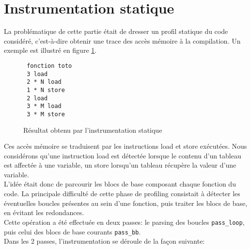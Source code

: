 \section{Instrumentation statique}

La problématique de cette partie était de dresser un profil statique du code considéré, c'est-à-dire obtenir une trace des accès mémoire à la compilation. Un exemple est illustré en figure \ref{fig:static_result}.

\begin{figure}[here]
  \centering
\begin{verbatim}
 fonction toto
 3 load
 2 * N load
 1 * N store
 2 load
 3 * M load
 3 * M store
\end{verbatim}
  \caption{Résultat obtenu par l'instrumentation statique}
  \label{fig:static_result}
\end{figure}

 Ces accès mémoire se traduisent par les instructions load et store exécutées. Nous considérons qu'une instruction load est détectée lorsque le contenu d'un tableau est affectée à une variable, un store lorsqu'un tableau récupère la valeur d'une variable.\\

L'idée était donc de parcourir les blocs de base composant chaque fonction du code. La principale difficulté de cette phase de profiling consistait à détecter les éventuelles boucles présentes au sein d'une fonction, puis traiter les blocs de base, en évitant les redondances.\\

Cette opération a été effectuée en deux passes: le parsing des boucles \verb#pass_loop#, puis celui des blocs de base courants \verb#pass_bb#.\\

Dans les 2 passes, l'instrumentation se déroule de la façon suivante:\\

